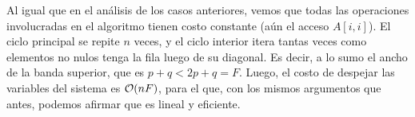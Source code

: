  Al igual que en el análisis de los casos anteriores, vemos que todas las operaciones involucradas en el algoritmo tienen costo constante (aún el acceso $A[i,i]$). El ciclo principal se repite $n$ veces, y el ciclo interior itera tantas veces como elementos no nulos tenga la fila luego de su diagonal. Es decir, a lo sumo el ancho de la banda superior, que es $p+q < 2p+q = F$. Luego, el costo de despejar las variables del sistema es $\mathcal{O}(nF)$, para el que, con los mismos argumentos que antes, podemos afirmar que es lineal y eficiente.
